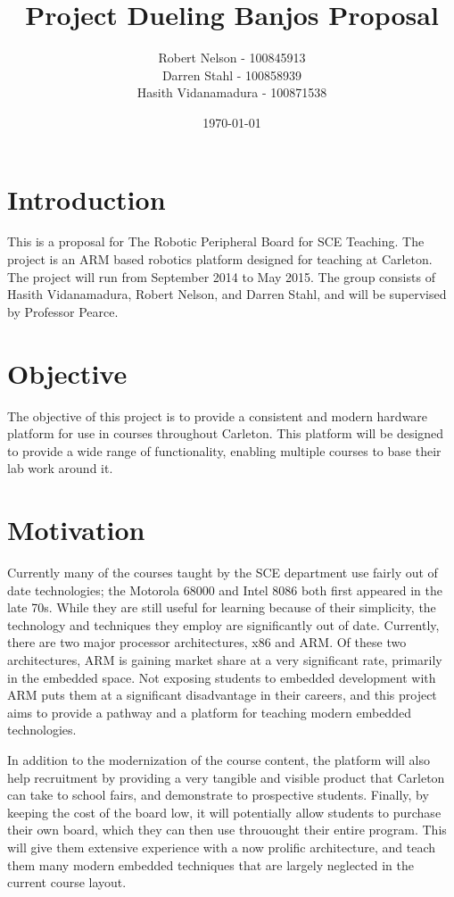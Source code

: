 \documentclass[letterpaper]{article}
\title{Project Dueling Banjos Proposal}
\author{
Robert Nelson - 100845913 \\
Darren Stahl - 100858939\\
Hasith Vidanamadura - 100871538
}
\date{\today}
\begin{document}
\maketitle

\section{Introduction}

This is a proposal for The Robotic Peripheral Board for SCE Teaching. The project is an ARM based robotics platform designed for teaching at Carleton. The project will run from September 2014 to May 2015. The group consists of Hasith Vidanamadura, Robert Nelson, and Darren Stahl, and will be supervised by Professor Pearce.

\section{Objective}

The objective of this project is to provide a consistent and modern hardware platform for use in courses throughout Carleton. This platform will be designed to provide a wide range of functionality, enabling multiple courses to base their lab work around it.

\section{Motivation}
Currently many of the courses taught by the SCE department use fairly out of date technologies; the Motorola 68000 and Intel 8086 both first appeared in the late 70s. While they are still useful for learning because of their simplicity, the technology and techniques they employ are significantly out of date. Currently, there are two major processor architectures, x86 and ARM. Of these two architectures, ARM is gaining market share at a very significant rate, primarily in the embedded space. Not exposing students to embedded development with ARM puts them at a significant disadvantage in their careers, and this project aims to provide a pathway and a platform for teaching  modern embedded technologies. 

In addition to the modernization of the course content, the platform will also help recruitment by providing a very tangible and visible product that Carleton can take to school fairs, and demonstrate to prospective students. Finally, by keeping the cost of the board low, it will potentially allow students to purchase their own board, which they can then use throuought their entire program. This will give them extensive experience with a now prolific architecture, and teach them many modern embedded techniques that are largely neglected in the current course layout.
\end{document}
